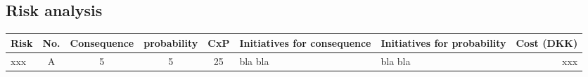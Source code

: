 \subsection{Risk analysis}

\begin{table}[h!]
\centering
\begin{tabular}[0.8\textswidth]{|l |c |c |c |c |p{2.8cm} |p{2.8cm} |r|}
\hline
Risk 	&	No.	& Consequence	& probability	& CxP	& Initiatives \newline for consequence	& Initiatives \newline for probability	& 	Cost (DKK) \\
\hline
xxx		& A		&	5			&		5		& 25	&	bla bla					&		bla bla					&	xxx\\
\hline
\end{tabular}
\end{table}


